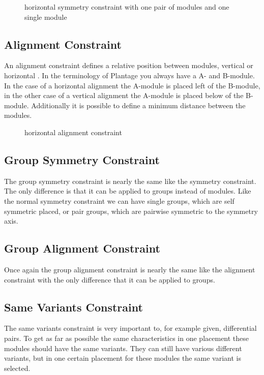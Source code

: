 \begin{figure}
	\centering
	
	\caption{horizontal symmetry constraint with one pair of modules and one single module}
	\label{fig:constraint_symmetry}
\end{figure}

\subsection{Alignment Constraint}
An alignment constraint defines a relative position between modules, vertical or horizontal . In the terminology of Plantage you always have a A- and B-module. In the case of a horizontal alignment the A-module is placed left of the B-module, in the other case of a vertical alignment the A-module is placed below of the B-module. Additionally it is possible to define a minimum distance between the modules.

\begin{figure}
	\centering
	
	\caption{horizontal alignment constraint}
	\label{fig:constraint_alignment}
\end{figure}

\subsection{Group Symmetry Constraint}
The group symmetry constraint is nearly the same like the symmetry constraint. The only difference is that it can be applied to groups instead of modules. Like the normal symmetry constraint we can have single groups, which are self symmetric placed, or pair groups, which are pairwise symmetric to the symmetry axis.

\subsection{Group Alignment Constraint}
Once again the group alignment constraint is nearly the same like the alignment constraint with the only difference that it can be applied to groups.

\subsection{Same Variants Constraint}
The same variants constraint is very important to, for example given, differential pairs. To get as far as possible the same characteristics in one placement these modules should have the same variants. They can still have various different variants, but in one certain placement for these modules the same variant is selected.

